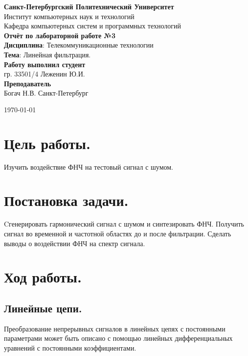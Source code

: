 \documentclass[a4paper,14pt]{extarticle}
\begin{document}
\begin{titlepage}
\centering 
{\bfseries Санкт-Петербургский Политехнический Университет} \\
Институт компьютерных наук и технологий \\
Кафедра компьютерных систем и программных технологий \\
\vspace{5cm}
{\centering \textbf{Отчёт по лабораторной работе №3} \\ 
\vspace{0.15cm}
\textbf{Дисциплина}: Телекоммуникационные технологии \\
\vspace{0.15cm}
\textbf{Тема}: Линейная фильтрация.} \\
\vspace{4cm}
\hfill {\bfseries Работу выполнил студент}  \\
\hfill гр. 33501/4 Леженин Ю.И. \\
\hfill {\bfseries Преподаватель}  \\
\hfill Богач Н.В.
\vfill
Санкт-Петербург \\
{\large \today\par}
\end{titlepage}

\section{Цель работы.}

Изучить воздействие ФНЧ на тестовый сигнал с шумом.

\section{Постановка задачи.} 

Cгенерировать гармонический сигнал с шумом
и синтезировать ФНЧ. Получить сигнал во временной и частотной
областях до и после фильтрации. Сделать выводы о воздействии
ФНЧ на спектр сигнала.

\section{Ход работы.}

\subsection{Линейные цепи.}
Преобразование непрерывных сигналов в линейных цепях с постоянными параметрами может быть описано с помощью линейных дифференциальных уравнений с постоянными коэффициентами.
\end{document}
